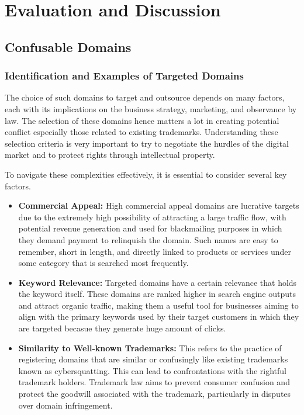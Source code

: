 \chapter{Evaluation and Discussion}
\section{Confusable Domains}
\subsection{Identification and Examples of Targeted Domains}

The choice of such domains to target and outsource depends on many factors, each with its implications on the business strategy, marketing, and observance by law. The selection of these domains hence matters a lot in creating potential conflict especially those related to existing trademarks. Understanding these selection criteria is very important to try to negotiate the hurdles of the digital market and to protect rights through intellectual property. 

To navigate these complexities effectively, it is essential to consider several key factors. 

\begin{itemize}
  \item \textbf{Commercial Appeal:} High commercial appeal domains are lucrative targets due to the extremely high possibility of attracting a large traffic flow, with potential revenue generation and used for blackmailing purposes in which they demand payment to relinquish the domain. Such names are easy to remember, short in length, and directly linked to products or services under some category that is searched most frequently.\cite{Li2002ConflictDomainTrademark}
  
  \item \textbf{Keyword Relevance:} Targeted domains have a certain relevance that holds the keyword itself. These domains are ranked higher in search engine outputs and attract organic traffic, making them a useful tool for businesses aiming to align with the primary keywords used by their target customers in which they are targeted becasue they generate huge amount of clicks.
  
  \item \textbf{Similarity to Well-known Trademarks:} This refers to the practice of registering domains that are similar or confusingly like existing trademarks known as cybersquatting. This can lead to confrontations with the rightful trademark holders. Trademark law aims to prevent consumer confusion and protect the goodwill associated with the trademark, particularly in disputes over domain infringement.
\end{itemize}

